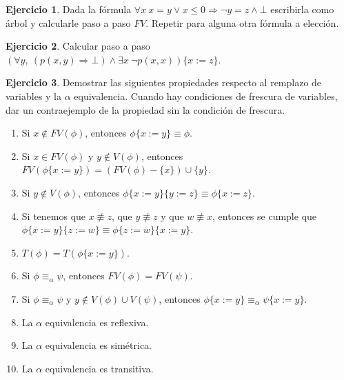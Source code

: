 \documentclass[a4paper,12pt]{book}
\newcommand{\Ra}{\Rightarrow}
\theoremstyle{definition}
\newtheorem{ejercicio}{Ejercicio}
\begin{document}
	
	\begin{ejercicio} Dada la fórmula $\forall x ~x=y\vee x\leq 0\Ra \lnot y=z\wedge \bot$ escribirla como árbol y calcularle paso a paso $FV$. Repetir para alguna otra fórmula a elección.
	\end{ejercicio}
	
	\begin{ejercicio}
		Calcular paso a paso $(\forall y,~(p(x,y)\Ra\bot)\wedge\exists x~\lnot p(x,x))\{x:=z\}$.
	\end{ejercicio}
	
	\begin{ejercicio}
		Demostrar las siguientes propiedades respecto al remplazo de variables y la $\alpha$ equivalencia. Cuando hay condiciones de frescura de variables, dar un contraejemplo de la propiedad sin la condición de frescura.
		\begin{enumerate}\parskip-.5ex
			\item Si $x\not\in FV(\phi)$, entonces $\phi\{x:=y\}\equiv\phi$.
			\item Si $x\in FV(\phi)$ y $y\not\in V(\phi)$, entonces $FV(\phi\{x:=y\})=(FV(\phi)-\{x\})\cup\{y\}$.
			\item Si $y\not\in V(\phi)$, entonces $\phi\{x:=y\}\{y:=z\}\equiv \phi\{x:=z\}$.
			\item Si tenemos que $x\not\equiv z$, que $y\not\equiv z$ y que $w\not\equiv x$, entonces se cumple que\linebreak $\phi\{x:=y\}\{z:=w\}\equiv\phi\{z:=w\}\{x:=y\}$.
			\item $T(\phi)=T(\phi\{x:=y\})$.
			\item Si $\phi\equiv_\alpha\psi$, entonces $FV(\phi)=FV(\psi)$.
			\item 	Si $\phi\equiv_\alpha\psi$ y $y\not\in V(\phi)\cup V(\psi)$, entonces $\phi\{x:=y\}\equiv_\alpha\psi\{x:=y\}$.
			\item La $\alpha$ equivalencia es reflexiva.
			\item La $\alpha$ equivalencia es simétrica.
			\item La $\alpha$ equivalencia es transitiva.
		\end{enumerate}
		
	\end{ejercicio}
	
\end{document}
